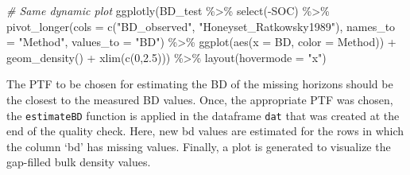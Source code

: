 \documentclass[
  10pt,
  b5paper,
  oneside]{book}
\newenvironment{Shaded}{\begin{snugshade}}{\end{snugshade}}
\newcommand{\AttributeTok}[1]{\textcolor[rgb]{0.77,0.63,0.00}{#1}}
\newcommand{\CommentTok}[1]{\textcolor[rgb]{0.56,0.35,0.01}{\textit{#1}}}
\newcommand{\DecValTok}[1]{\textcolor[rgb]{0.00,0.00,0.81}{#1}}
\newcommand{\DocumentationTok}[1]{\textcolor[rgb]{0.56,0.35,0.01}{\textbf{\textit{#1}}}}
\newcommand{\FloatTok}[1]{\textcolor[rgb]{0.00,0.00,0.81}{#1}}
\newcommand{\FunctionTok}[1]{\textcolor[rgb]{0.00,0.00,0.00}{#1}}
\newcommand{\NormalTok}[1]{#1}
\newcommand{\OtherTok}[1]{\textcolor[rgb]{0.56,0.35,0.01}{#1}}
\newcommand{\SpecialCharTok}[1]{\textcolor[rgb]{0.00,0.00,0.00}{#1}}
\newcommand{\StringTok}[1]{\textcolor[rgb]{0.31,0.60,0.02}{#1}}
\begin{document}
\begin{Shaded}
\begin{Highlighting}[]
\CommentTok{\# Same dynamic plot }
\FunctionTok{ggplotly}\NormalTok{(BD\_test }\SpecialCharTok{\%\textgreater{}\%} 
           \FunctionTok{select}\NormalTok{(}\SpecialCharTok{{-}}\NormalTok{SOC) }\SpecialCharTok{\%\textgreater{}\%} 
           \FunctionTok{pivot\_longer}\NormalTok{(}\AttributeTok{cols =} \FunctionTok{c}\NormalTok{(}\StringTok{"BD\_observed"}\NormalTok{, }\StringTok{"Honeyset\_Ratkowsky1989"}\NormalTok{), }
                        \AttributeTok{names\_to =} \StringTok{"Method"}\NormalTok{, }\AttributeTok{values\_to =} \StringTok{"BD"}\NormalTok{) }\SpecialCharTok{\%\textgreater{}\%} 
           \FunctionTok{ggplot}\NormalTok{(}\FunctionTok{aes}\NormalTok{(}\AttributeTok{x =}\NormalTok{ BD, }\AttributeTok{color =}\NormalTok{ Method)) }\SpecialCharTok{+} 
           \FunctionTok{geom\_density}\NormalTok{() }\SpecialCharTok{+} \FunctionTok{xlim}\NormalTok{(}\FunctionTok{c}\NormalTok{(}\DecValTok{0}\NormalTok{,}\FloatTok{2.5}\NormalTok{))) }\SpecialCharTok{\%\textgreater{}\%}
  \FunctionTok{layout}\NormalTok{(}\AttributeTok{hovermode =} \StringTok{"x"}\NormalTok{)}
\end{Highlighting}
\end{Shaded}

The PTF to be chosen for estimating the BD of the missing horizons should be the closest to the measured BD values. Once, the appropriate PTF was chosen, the \texttt{estimateBD} function is applied in the dataframe \texttt{dat} that was created at the end of the quality check. Here, new bd values are estimated for the rows in which the column `bd' has missing values. Finally, a plot is generated to visualize the gap-filled bulk density values.

\begin{Shaded}
\end{Shaded}
\end{document}
